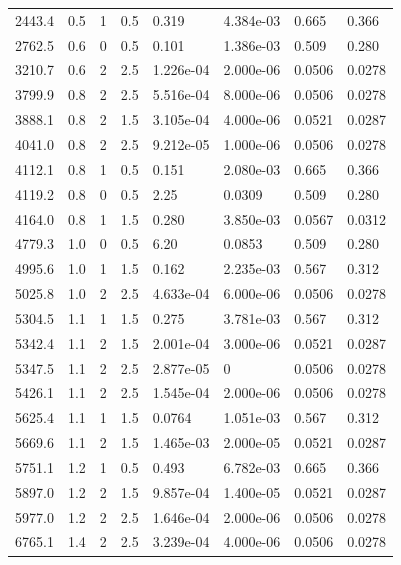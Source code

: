 \documentclass[preview]{standalone}
\begin{document}
{{\begin{tabular}{L{1.2cm}C{1.2cm} C{0.3cm}C{0.5cm} C{1.4cm}C{1.4cm} C{1.4cm}C{1.4cm}}
  2443.4  &   0.5  & 1     & 0.5 &  0.319  & 4.384e-03  & 0.665 &  0.366   \\ 
  2762.5  &   0.6  & 0     & 0.5 &  0.101  & 1.386e-03  & 0.509 &  0.280   \\ 
  3210.7  &   0.6  & 2     & 2.5 &  1.226e-04  & 2.000e-06  & 0.0506 &  0.0278   \\ 
  3799.9  &   0.8  & 2     & 2.5 &  5.516e-04  & 8.000e-06  & 0.0506 &  0.0278   \\ 
  3888.1  &   0.8  & 2     & 1.5 &  3.105e-04  & 4.000e-06  & 0.0521 &  0.0287   \\ 
  4041.0  &   0.8  & 2     & 2.5 &  9.212e-05  & 1.000e-06  & 0.0506 &  0.0278   \\ 
  4112.1  &   0.8  & 1     & 0.5 &  0.151  & 2.080e-03  & 0.665 &  0.366   \\ 
  4119.2  &   0.8  & 0     & 0.5 &  2.25  & 0.0309  & 0.509 &  0.280   \\ 
  4164.0  &   0.8  & 1     & 1.5 &  0.280  & 3.850e-03  & 0.0567 &  0.0312   \\ 
  4779.3  &   1.0  & 0     & 0.5 &  6.20  & 0.0853  & 0.509 &  0.280   \\ 
  4995.6  &   1.0  & 1     & 1.5 &  0.162  & 2.235e-03  & 0.567 &  0.312   \\ 
  5025.8  &   1.0  & 2     & 2.5 &  4.633e-04  & 6.000e-06  & 0.0506 &  0.0278   \\ 
  5304.5  &   1.1  & 1     & 1.5 &  0.275  & 3.781e-03  & 0.567 &  0.312   \\ 
  5342.4  &   1.1  & 2     & 1.5 &  2.001e-04  & 3.000e-06  & 0.0521 &  0.0287   \\ 
  5347.5  &   1.1  & 2     & 2.5 &  2.877e-05  & 0  & 0.0506 &  0.0278   \\ 
  5426.1  &   1.1  & 2     & 2.5 &  1.545e-04  & 2.000e-06  & 0.0506 &  0.0278   \\ 
  5625.4  &   1.1  & 1     & 1.5 &  0.0764  & 1.051e-03  & 0.567 &  0.312   \\ 
  5669.6  &   1.1  & 2     & 1.5 &  1.465e-03  & 2.000e-05  & 0.0521 &  0.0287   \\ 
  5751.1  &   1.2  & 1     & 0.5 &  0.493  & 6.782e-03  & 0.665 &  0.366   \\ 
  5897.0  &   1.2  & 2     & 1.5 &  9.857e-04  & 1.400e-05  & 0.0521 &  0.0287   \\ 
  5977.0  &   1.2  & 2     & 2.5 &  1.646e-04  & 2.000e-06  & 0.0506 &  0.0278   \\ 
  6765.1  &   1.4  & 2     & 2.5 &  3.239e-04  & 4.000e-06  & 0.0506 &  0.0278   \\ 

\end{tabular}}}
\end{document}
